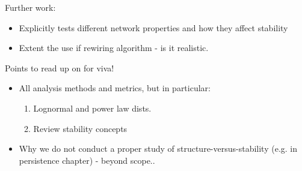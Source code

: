 Further work:
\begin{itemize}
	\item Explicitly tests different network properties and how they affect stability 
	\item Extent the use if rewiring algorithm - is it realistic.
\end{itemize}

Points to read up on for viva!

\begin{itemize}
	\item All analysis methods and metrics, but in particular:
	\begin{enumerate}
		\item Lognormal and power law dists. \cite{mcgill2007species}
		\item Review stability concepts \cite{donohue2013dimensionality}
	\end{enumerate}		
	
	\item Why we do not conduct a proper study of structure-versus-stability (e.g. in persistence chapter) - beyond scope..
\end{itemize}
